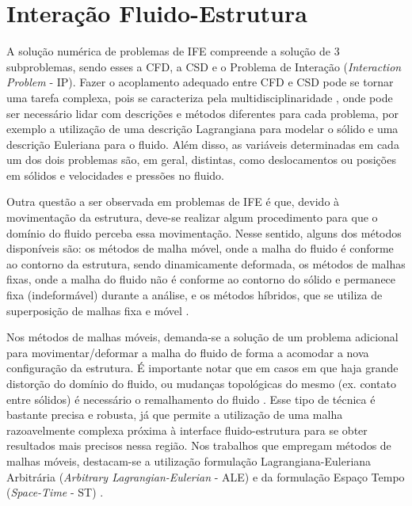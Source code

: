 \section{Interação Fluido-Estrutura} \label{IFE}

A solução numérica de problemas de IFE compreende a solução de 3 subproblemas, sendo esses a CFD, a CSD e o Problema de Interação (\textit{Interaction Problem} - IP). Fazer o acoplamento adequado entre CFD e CSD pode se tornar uma tarefa complexa, pois se caracteriza pela multidisciplinaridade \cite{hou2012numerical}, onde pode ser necessário lidar com descrições e métodos diferentes para cada problema, por exemplo a utilização de uma descrição Lagrangiana para modelar o sólido e uma descrição Euleriana para o fluido. Além disso, as variáveis determinadas em cada um dos dois problemas são, em geral, distintas, como deslocamentos ou posições em sólidos e velocidades e pressões no fluido.

Outra questão a ser observada em problemas de IFE é que, devido à movimentação da estrutura, deve-se realizar algum procedimento para que o domínio do fluido perceba essa movimentação. Nesse sentido, alguns dos métodos disponíveis são: os métodos de malha móvel, onde a malha do fluido é conforme ao contorno da estrutura, sendo dinamicamente deformada, os métodos de malhas fixas, onde a malha do fluido não é conforme ao contorno do sólido e permanece fixa (indeformável) durante a análise, e os métodos híbridos, que se utiliza de superposição de malhas fixa e móvel \cite{fernandes2020tecnica}.

Nos métodos de malhas móveis, demanda-se a solução de um problema adicional para movimentar/deformar a malha do fluido de forma a acomodar a nova configuração da estrutura. É importante notar que em casos em que haja grande distorção do domínio do fluido, ou mudanças topológicas do mesmo (ex. contato entre sólidos) é necessário o remalhamento do fluido \cite{terahara2020heart}. Esse tipo de técnica é bastante precisa e robusta, já que permite a utilização de uma malha razoavelmente complexa próxima à interface fluido-estrutura para se obter resultados mais precisos nessa região. Nos trabalhos que empregam métodos de malhas móveis, destacam-se a utilização formulação Lagrangiana-Euleriana Arbitrária (\textit{Arbitrary Lagrangian-Eulerian} - ALE) \cite{donea1982arbitrary,kanchi20073d,fernandes2019ale} e da formulação Espaço Tempo (\textit{Space-Time} - ST) \cite{takizawa2011multiscale,terahara2020heart,takizawa2011stabilized}.

